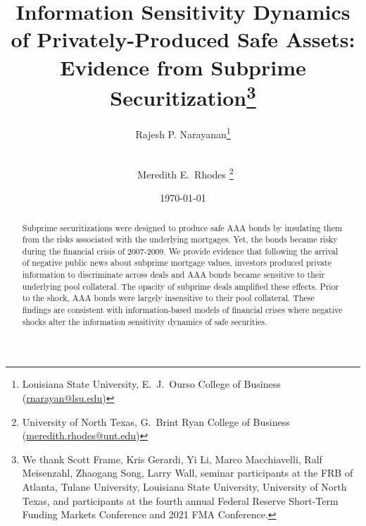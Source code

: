 \documentclass[12pt]{article}
\title{{ 
 Information Sensitivity Dynamics of Privately-Produced Safe Assets: Evidence from Subprime Securitization}\thanks{We thank Scott Frame, Kris Gerardi, Yi Li, Marco Macchiavelli, Ralf Meisenzahl,  Zhaogang Song, Larry Wall, seminar participants at the FRB of Atlanta, Tulane University, Louisiana State University, University of North Texas, and participants at the fourth annual Federal Reserve Short-Term Funding Markets Conference and 2021 FMA Conference.}
 }
\author{{ Rajesh P. Narayanan}\thanks{Louisiana State University, E.\ J.\ Ourso College of Business (\href{mailto:rnarayan@lsu.edu}{rnarayan@lsu.edu}) } \\ \\
\and
{\ Meredith E.\ Rhodes }\thanks{University of North Texas, G.\ Brint Ryan College of Business (\href{mailto:meredith.rhodes@unt.edu}{meredith.rhodes@unt.edu}) }}
\date{\today}
\begin{document}
\maketitle

\begin{abstract}
 
Subprime securitizations were designed to produce safe AAA bonds by insulating them from the risks associated with the underlying mortgages. Yet, the bonds became risky during the financial crisis of 2007-2009.  We provide evidence that following the arrival of negative public news about subprime mortgage values, investors produced private information to discriminate across deals and AAA bonds became sensitive to their underlying pool collateral.  The opacity of subprime deals amplified these effects.  Prior to the shock, AAA bonds were largely insensitive to their pool collateral.  These findings are consistent with information-based models of financial crises where negative shocks alter the information sensitivity dynamics of safe securities.




\end{abstract}
\end{document}
